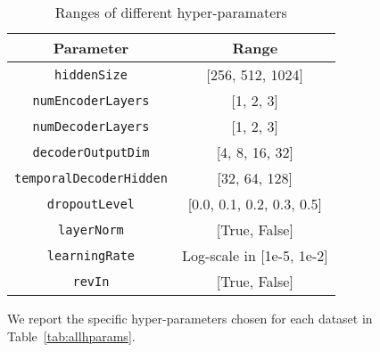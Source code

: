\documentclass[10pt]{article} \usepackage[accepted]{tmlr}
\theoremstyle{plain}
\theoremstyle{definition}
\theoremstyle{remark}
\begin{document}
\begin{table}[ht]
\centering
\begin{tabular}{c|c}
\toprule
Parameter & Range \\
\midrule
\texttt{hiddenSize} &  [256, 512, 1024]\\
\hline
\texttt{numEncoderLayers} & [1, 2, 3] \\
\hline
\texttt{numDecoderLayers} & [1, 2, 3] \\
\hline
\texttt{decoderOutputDim}& [4, 8, 16, 32] \\
\hline
\texttt{temporalDecoderHidden} & [32, 64, 128] \\
\hline
\texttt{dropoutLevel} & [0.0, 0.1, 0.2, 0.3, 0.5] \\
\hline
\texttt{layerNorm} & [True, False] \\
\hline
\texttt{learningRate} & Log-scale in [1e-5, 1e-2]\\
\hline
\texttt{revIn} & [True, False] \\
\bottomrule
\end{tabular}
\caption{Ranges of different hyper-paramaters}
\label{tab:hptuning}
\end{table}

We report the specific hyper-parameters chosen for each dataset in Table~\ref{tab:allhparams}.

\begin{table*}[!ht]
  \centering
  \caption{The hyper-parameters for different experimental settings.}\label{tab:allhparams}
\end{table*}
\end{document}
